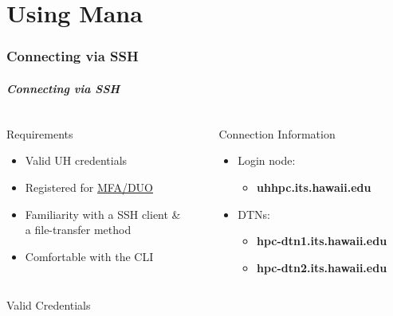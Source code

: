 \part{Using Mana}
\begin{frame}
			 \partpage
\end{frame}


\section[Connecting via SSH]{Connecting via SSH}
\begin{frame}
\frametitle{Connecting via SSH}
\begin{columns}
	\begin{column}{0.46\textwidth}
		\begin{block}{Requirements}
			\begin{itemize}
				\item Valid UH credentials 
				\item Registered for \href{http://www.hawaii.edu/its/uhlogin/}{MFA/DUO}
				\item Familiarity with a SSH client \&\\a file-transfer method
				\item Comfortable with the CLI
			\end{itemize}
                        \end{block}
	\end{column}
	\begin{column}{0.46\textwidth}
		\begin{block}{Connection Information}\
	\begin{itemize}
		\item Login node: 
		  \begin{itemize} 
		  \item \textbf{uhhpc.its.hawaii.edu}
		  \end{itemize}
		\item DTNs:
		  \begin{itemize} 
		  \item \textbf{hpc-dtn1.its.hawaii.edu}
		  \item \textbf{hpc-dtn2.its.hawaii.edu}
		  \end{itemize}
	\end{itemize}
        \end{block}
	        \end{column}                
	\end{columns}
	\begin{block}{Valid Credentials}\footnotesize

\end{block}
\end{frame}
